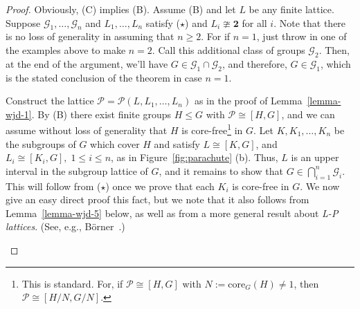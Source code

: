 \documentclass[cm,dissertation,actual,final]{uhthesis}
\theoremstyle{plain}
\theoremstyle{definition}
\theoremstyle{remark}
\numberwithin{theorem}{section}
\numberwithin{claim}{chapter}
\numberwithin{equation}{section}
\numberwithin{conjecture}{chapter}
\newcommand{\<}{\ensuremath{\langle}}
\renewcommand{\>}{\ensuremath{\rangle}}
\renewcommand{\leq}{\ensuremath{\leqslant}}
\renewcommand{\geq}{\ensuremath{\geqslant}}
\newcommand{\core}{\ensuremath{\mathrm{core}}}
\newcommand{\0}{\ensuremath{\mathbf{0}}}
\newcommand{\1}{\ensuremath{\mathbf{1}}}
\newcommand{\2}{\ensuremath{\mathbf{2}}}
\newcommand{\3}{\ensuremath{\mathbf{3}}}
\newcommand{\4}{\ensuremath{\mathbf{4}}}
\newcommand{\5}{\ensuremath{\mathbf{5}}}
\newcommand{\sG}{\ensuremath{\mathscr{G}}}
\newcommand{\sP}{\ensuremath{\mathscr{P}}}
\newcommand{\two}{\ensuremath{\mathbf{2}}}
\begin{document}
\begin{proof}
Obviously, (C) implies (B).  Assume (B) and let $L$ be any finite lattice.  Suppose 
$\sG_1, \dots, \sG_n$ and $L_1, \dots, L_n$ satisfy ($\star$) and %
$L_i \ncong \two$ for all $i$.
Note that there is no loss of generality in assuming that $n\geq 2$. 
For if $n=1$, just throw in one of the examples above to make $n=2$.
Call this additional class of groups $\sG_2$.  Then, at the end of the argument, we'll
have $G\in \sG_1\cap \sG_2$, and therefore, $G\in \sG_1$, which is the stated
conclusion of the theorem in case $n=1$.

Construct the lattice $\sP = \sP(L, L_1, \dots, L_n)$ as in the proof of
Lemma~\ref{lemma-wjd-1}.  By (B) there exist finite groups $H \leq G$ with $\sP \cong
[H,G]$, and we can assume without loss of generality that $H$ is
core-free\footnote{This is standard.  For, if $\sP \cong [H,G]$ with
  $N:=\core_G(H)\neq 1$, then $\sP \cong [H/N, G/N]$.} in $G$.
Let $K, K_1, \dots, K_n$ be the subgroups of $G$ which cover $H$ and satisfy $L \cong
[K, G]$, and $L_i \cong [K_i, G], \; 1\leq i \leq n$, as in
Figure~\ref{fig:parachute} (b).
Thus, $L$ is an upper interval in the subgroup lattice of $G$, and it remains to show
that $G\in \bigcap\limits_{i=1}^n \sG_i$.  
This will follow from ($\star$) once we prove that 
each $K_i$ is core-free in $G$.
We now give an easy direct proof this fact,
but we note that it also follows from Lemma~\ref{lemma-wjd-5} below, as well as from a more
general result about \emph{L-P lattices}. (See, e.g., B\"orner~\cite{Borner:1999}.)

\begin{figure}[!h]
  \centering
\label{fig:isomorphism}  
\end{figure}
\end{proof}
\end{document}
